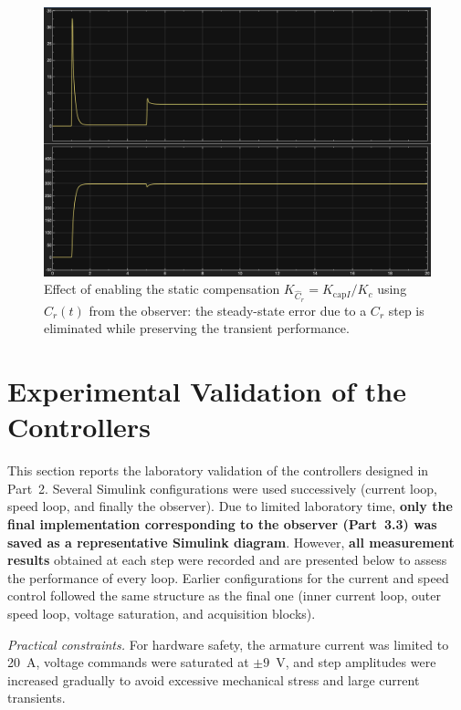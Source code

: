 \documentclass{rapportCS}
\begin{document}
\begin{figure}[h]
  \centering
  \includegraphics[width=.95\linewidth]{figures/kcplugged.png}
  \caption{Effect of enabling the static compensation $K_{\hat C_r}=K_{\text{cap}I}/K_c$ using $\hat C_r(t)$ from the observer: the steady-state error due to a $C_r$ step is eliminated while preserving the transient performance.}
  \label{fig:kcplugged}
\end{figure}

\newpage

\section{Experimental Validation of the Controllers}

\label{sec:exp}

This section reports the laboratory validation of the controllers designed in Part~2. 
Several Simulink configurations were used successively (current loop, speed loop, and finally the observer). 
Due to limited laboratory time, \textbf{only the final implementation corresponding to the observer (Part~3.3) was saved as a representative Simulink diagram}. 
However, \textbf{all measurement results} obtained at each step were recorded and are presented below to assess the performance of every loop. 
Earlier configurations for the current and speed control followed the same structure as the final one (inner current loop, outer speed loop, voltage saturation, and acquisition blocks).

\vspace{4pt}
\noindent\textit{Practical constraints.} For hardware safety, the armature current was limited to 20~A, voltage commands were saturated at $\pm9$~V, and step amplitudes were increased gradually to avoid excessive mechanical stress and large current transients.
\end{document}

